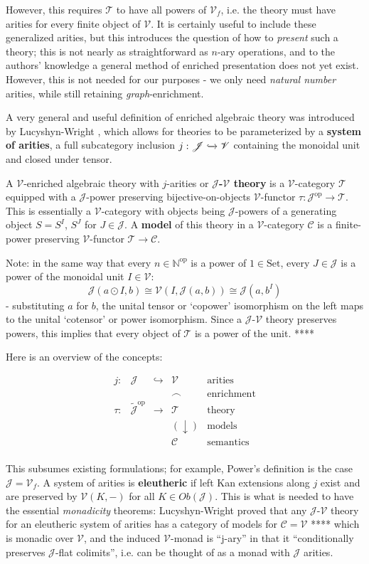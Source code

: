 \documentclass[a4paper,UKenglish]{article}
\theoremstyle{definition}
\newcommand{\Set}{\mathrm{Set}}
\newcommand{\op}{\mathrm{op}}
\newcommand{\NN}{\mathbb{N}}
\newcommand{\V}{\mathscr{V}}
\newcommand{\C}{\mathscr{C}}
\newcommand{\T}{\mathscr{T}}
\newcommand{\J}{\mathscr{J}}
\begin{document}
However, this requires $\T$ to have all powers of $\V_f$, i.e. the theory must have arities for every finite object of $\V$. It is certainly useful to include these generalized arities, but this introduces the question of how to \textit{present} such a theory; this is not nearly as straightforward as $n$-ary operations, and to the authors' knowledge a general method of enriched presentation does not yet exist. However, this is not needed for our purposes - we only need \textit{natural number} arities, while still retaining \textit{graph}-enrichment.

A very general and useful definition of enriched algebraic theory was introduced by Lucyshyn-Wright \cite{rbb}, which allows for theories to be parameterized by a \textbf{system of arities}, a full subcategory inclusion $j: \J \xhookrightarrow{} \V$ containing the monoidal unit and closed under tensor.

A $\V$-enriched algebraic theory with $j$-arities or \textbf{$\J$-$\V$ theory} is a $\V$-category $\T$ equipped with a $\J$-power preserving bijective-on-objects $\V$-functor $\tau:\J^\op \to \T$. This is essentially a $\V$-category with objects being $\J$-powers of a generating object $S = S^I$, $S^J$ for $J \in \J$. A \textbf{model} of this theory in a $\V$-category $\C$ is a finite-power preserving $\V$-functor $\T \to \C$.

Note: in the same way that every $n\in \NN^\op$ is a power of $1 \in \Set$, every $J\in \J$ is a power of the monoidal unit $I\in \V$: $$\J(a\odot I,b) \cong \V(I, \J(a,b)) \cong \J(a,b^I)$$ - substituting $a$ for $b$, the unital tensor or `copower' isomorphism on the left maps to the unital `cotensor' or power isomorphism. Since a $\J$-$\V$ theory preserves powers, this implies that every object of $\T$ is a power of the unit. ****

Here is an overview of the concepts: 

\[\begin{array}{ccccl}
j: & \J & \hookrightarrow & \V & \text{arities}\\
& & & \frown & \text{enrichment}\\
\tau: & \tilde{\J}^\op & \to & \T & \text{theory}\\
& & & (\downarrow) & \text{models}\\
& & & \C & \text{semantics}\\
\end{array}\]

This subsumes existing formulations; for example, Power's definition is the case $\J = \V_f$. A system of arities is \textbf{eleutheric} if left Kan extensions along $j$ exist and are preserved by $\V(K,-)$ for all $K \in Ob(\J)$. This is what is needed to have the essential \textit{monadicity} theorems: Lucyshyn-Wright proved that any $\J$-$\V$ theory for an eleutheric system of arities has a category of models for $\C = \V$ **** which is monadic over $\V$, and the induced $\V$-monad is ``j-ary'' in that it ``conditionally preserves $\J$-flat colimits'', i.e. can be thought of as a monad with $\J$ arities.
\end{document}
